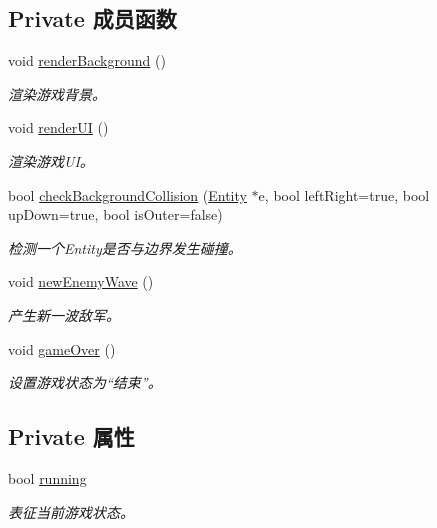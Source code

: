\subsection*{Private 成员函数}
\begin{DoxyCompactItemize}
\item 
void \hyperlink{class_world_adb9973193b6f45377a3911ed023a9f73}{render\+Background} ()
\begin{DoxyCompactList}\small\item\em 渲染游戏背景。 \end{DoxyCompactList}\item 
void \hyperlink{class_world_a96d63470a94d9ab0426db992981b5ce5}{render\+UI} ()
\begin{DoxyCompactList}\small\item\em 渲染游戏\+U\+I。 \end{DoxyCompactList}\item 
bool \hyperlink{class_world_a3b447a1788dc0d2e507dce41486ad1b4}{check\+Background\+Collision} (\hyperlink{class_entity}{Entity} $\ast$e, bool left\+Right=true, bool up\+Down=true, bool is\+Outer=false)
\begin{DoxyCompactList}\small\item\em 检测一个\+Entity是否与边界发生碰撞。 \end{DoxyCompactList}\item 
void \hyperlink{class_world_a9957df94d0d75429c23c7d70c2db282e}{new\+Enemy\+Wave} ()
\begin{DoxyCompactList}\small\item\em 产生新一波敌军。 \end{DoxyCompactList}\item 
void \hyperlink{class_world_a699c52e5991e939402c6c7396c3e931a}{game\+Over} ()
\begin{DoxyCompactList}\small\item\em 设置游戏状态为“结束”。 \end{DoxyCompactList}\end{DoxyCompactItemize}
\subsection*{Private 属性}
\begin{DoxyCompactItemize}
\item 
bool \hyperlink{class_world_ad9027ba6a4913c21191e7321e9bb2f9f}{running}
\begin{DoxyCompactList}\small\item\em 表征当前游戏状态。 \end{DoxyCompactList}\end{DoxyCompactItemize}


